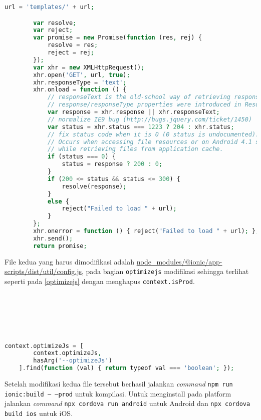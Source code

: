 \begin{lstlisting}[frame=single, label={lst:noresourceloaderreplace}, language=PHP, caption=Kode pengganti untuk fungsi \texttt{get}]
url = 'templates/' + url;

        var resolve;
        var reject;
        var promise = new Promise(function (res, rej) {
            resolve = res;
            reject = rej;
        });
        var xhr = new XMLHttpRequest();
        xhr.open('GET', url, true);
        xhr.responseType = 'text';
        xhr.onload = function () {
            // responseText is the old-school way of retrieving response (supported by IE8 & 9)
            // response/responseType properties were introduced in ResourceLoader Level2 spec (supported by IE10)
            var response = xhr.response || xhr.responseText;
            // normalize IE9 bug (http://bugs.jquery.com/ticket/1450)
            var status = xhr.status === 1223 ? 204 : xhr.status;
            // fix status code when it is 0 (0 status is undocumented).
            // Occurs when accessing file resources or on Android 4.1 stock browser
            // while retrieving files from application cache.
            if (status === 0) {
                status = response ? 200 : 0;
            }
            if (200 <= status && status <= 300) {
                resolve(response);
            }
            else {
                reject("Failed to load " + url);
            }
        };
        xhr.onerror = function () { reject("Failed to load " + url); };
        xhr.send();
        return promise;
\end{lstlisting}

File kedua yang harus dimodifikasi adalah \url{node_modules/@ionic/app-scripts/dist/util/config.js}, pada bagian \texttt{optimizejs} modifikasi sehingga terlihat seperti pada \mbox{\ref{optimizejs}} dengan menghapus \texttt{context.isProd}.
\\
\\
\\
\\
\\
\\
\begin{lstlisting}[frame=single, label={optimizejs}, language=PHP, caption= \texttt{optimizejs} setelah modifikasi]
context.optimizeJs = [
        context.optimizeJs,
        hasArg('--optimizeJs')
    ].find(function (val) { return typeof val === 'boolean'; });
\end{lstlisting}
Setelah modifikasi kedua file tersebut berhasil jalankan \textit{command} \texttt{npm run ionic:build -- --prod} untuk kompilasi. Untuk menginstall pada platform jalankan \textit{command} \texttt{npx cordova run android} untuk Android dan \texttt{npx cordova build ios} untuk iOS.

